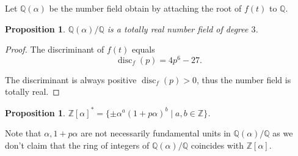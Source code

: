 \documentclass[a4paper]{article}
\newtheorem{Prop}[Thm]{Proposition}
\newcommand{\Q}{\mathbb{Q}}        %
\DeclareMathOperator{\disc}{disc}        %
\begin{document}
Let $\Q(\alpha)$ be the number field obtain by attaching the root of $f(t)$ to $\Q$.
\begin{Prop}
$\Q(\alpha) / \Q$ is a totally real number field of degree $3$.
\end{Prop}

\begin{proof}
The discriminant of $f(t)$ equals
$$\disc_f(p) = 4 p^6 - 27 .$$

The discriminant is always positive $\disc_f(p) > 0$, thus the number field is totally real.
\end{proof}


\begin{Prop}
$\mathbb{Z}[\alpha]^{*} = \{ \pm \alpha^a (1 + p \alpha)^b \mid a, b \in \mathbb{Z} \} $.
\end{Prop}

Note that $\alpha, 1 + p \alpha$ are not necessarily fundamental units in $\Q(\alpha)/\Q$ as we don't claim that the ring of integers of $\Q(\alpha) / \Q$ coincides with $\mathbb{Z}[\alpha]$.
\end{document}
